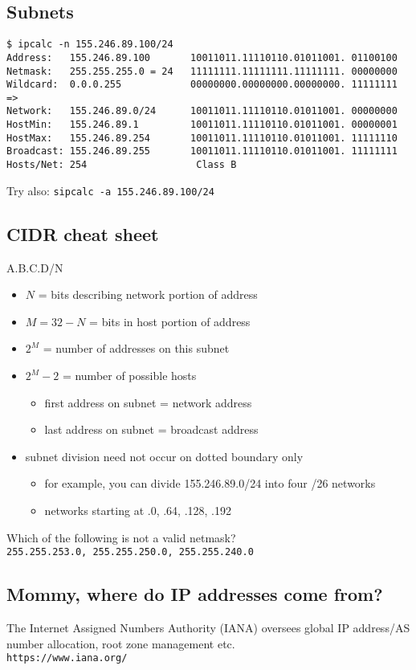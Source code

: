 \documentclass[xga]{xdvislides}
\begin{document}
\subsection{Subnets}
\begin{verbatim}
$ ipcalc -n 155.246.89.100/24
Address:   155.246.89.100       10011011.11110110.01011001. 01100100
Netmask:   255.255.255.0 = 24   11111111.11111111.11111111. 00000000
Wildcard:  0.0.0.255            00000000.00000000.00000000. 11111111
=>
Network:   155.246.89.0/24      10011011.11110110.01011001. 00000000
HostMin:   155.246.89.1         10011011.11110110.01011001. 00000001
HostMax:   155.246.89.254       10011011.11110110.01011001. 11111110
Broadcast: 155.246.89.255       10011011.11110110.01011001. 11111111
Hosts/Net: 254                   Class B
\end{verbatim}
\vspace{.5in}
Try also: \verb+sipcalc -a 155.246.89.100/24+

\subsection{CIDR cheat sheet}
A.B.C.D/N
\begin{itemize}
	\item $N$ = bits describing network portion of address
	\item $M=32-N$ = bits in host portion of address
	\item $2^M$ = number of addresses on this subnet
	\item $2^M - 2$ = number of possible hosts
		\begin{itemize}
			\item first address on subnet = network address
			\item last address on subnet = broadcast address
		\end{itemize}
	\item subnet division need not occur on dotted boundary only
		\begin{itemize}
			\item for example, you can divide 155.246.89.0/24
				into four /26 networks
			\item networks starting at .0, .64, .128, .192
		\end{itemize}
\end{itemize}
\addvspace{.5in}
Which of the following is not a valid netmask? \\
\verb+255.255.253.0, 255.255.250.0, 255.255.240.0+

\subsection{Mommy, where do IP addresses come from?}
\Huge
\vfill
\begin{center}
The Internet Assigned Numbers Authority (IANA) oversees global IP
address/AS number allocation, root zone management etc.
\\
\vspace{.5in}
\verb+https://www.iana.org/+
\end{center}
\vfill
\Normalsize
\end{document}
